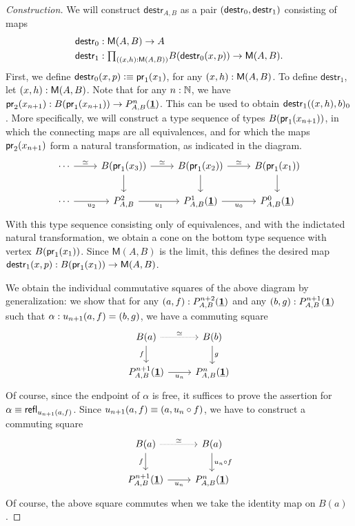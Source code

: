\begin{proof}[Construction]
We will construct $\mathsf{destr}_{A,B}$
as a pair ${\mathopen{}(\mathsf{destr}_0,\mathsf{destr}_1)\mathclose{}}$ consisting of maps
\begin{align*}
\mathsf{destr}_0 & : \mathsf{M}(A,B)\to A \\
\mathsf{destr}_1 & : \prd{\pairr{x,h}:\mathsf{M}(A,B)} B(\mathsf{destr}_0(x,p))\to \mathsf{M}(A,B).
\end{align*}
First, we define $\mathsf{destr}_0(x,p)\vcentcolon\equiv \mathsf{pr}_{1}(x_1)$,
for any ${\mathopen{}(x,h)\mathclose{}}:\mathsf{M}(A,B)$. 
To define $\mathsf{destr}_1$, let ${\mathopen{}(x,h)\mathclose{}}:\mathsf{M}(A,B)$. 
Note that for any $n:\mathbb{N}$, 
we have $\mathsf{pr}_{2}(x_{n+1}):B(\mathsf{pr}_{1}(x_{n+1}))\to P_{A,B}^n(\underline{\mathbf{1}})$.
This can be used to obtain $\mathsf{destr}_1({\mathopen{}(x,h)\mathclose{}},b)_0$. 
More specifically, we will construct a type sequence of types
$B(\mathsf{pr}_{1}(x_{n+1}))$, in which the connecting maps are all equivalences, 
and for which the maps $\mathsf{pr}_{2}(x_{n+1})$ form a natural transformation, 
as indicated in the diagram.
\begin{equation*}
\begin{tikzcd}
\cdots \arrow[r,"\eqvsym"] & B(\proj 1(x_3)) \arrow[r,"\eqvsym"] \arrow[d] & B(\proj 1(x_2)) \arrow[r,"\eqvsym"] \arrow[d] & B(\proj 1(x_1)) \arrow[d]
  \\
\cdots \arrow[r,swap,"u_2"] & P_{A,B}^2 \arrow[r,swap,"u_1"] & P_{A,B}^1(\unit) \arrow[r,swap,"u_0"] & P_{A,B}^0(\unit)
\end{tikzcd}
\end{equation*}
With this type sequence consisting only of equivalences,
and with the indictated natural transformation, we obtain a cone on the bottom
type sequence with vertex $B(\mathsf{pr}_{1}(x_1))$. Since $\mathsf{M}(A,B)$ is the
limit, this defines the desired map 
$\mathsf{destr}_1(x,p):B(\mathsf{pr}_{1}(x_1))\to \mathsf{M}(A,B)$.

We obtain the individual commutative squares of the above diagram by 
generalization: we show that for any ${\mathopen{}(a,f)\mathclose{}}:P_{A,B}^{n+2}(\underline{\mathbf{1}})$ and
any ${\mathopen{}(b,g)\mathclose{}}:P_{A,B}^{n+1}(\underline{\mathbf{1}})$ such that $\alpha:u_{n+1}(a,f)={\mathopen{}(b,g)\mathclose{}}$,
we have a commuting square
\begin{equation*}
\begin{tikzcd}
B(a) \arrow[r,densely dotted,"\eqvsym"] \arrow[d,swap,"f"] & B(b) \arrow[d,"g"] \\
P_{A,B}^{n+1}(\unit) \arrow[r,swap,"u_n"] & P_{A,B}^n(\unit)
\end{tikzcd}
\end{equation*}
Of course, since the endpoint of $\alpha$ is free, it suffices to prove the 
assertion for $\alpha\equiv \mathsf{refl}_{u_{n+1}(a,f)}$. 
Since $u_{n+1}(a,f)\equiv {\mathopen{}(a,u_{n}\circ f)\mathclose{}}$, 
we have to construct a commuting square
\begin{equation*}
\begin{tikzcd}
B(a) \arrow[r,densely dotted,"\eqvsym"] \arrow[d,swap,"f"] & B(a) \arrow[d,"u_n\circ f"] \\
P_{A,B}^{n+1}(\unit) \arrow[r,swap,"u_n"] & P_{A,B}^n(\unit)
\end{tikzcd}
\end{equation*}
Of course, the above square commutes when we take the identity map on $B(a)$.
\end{proof}


